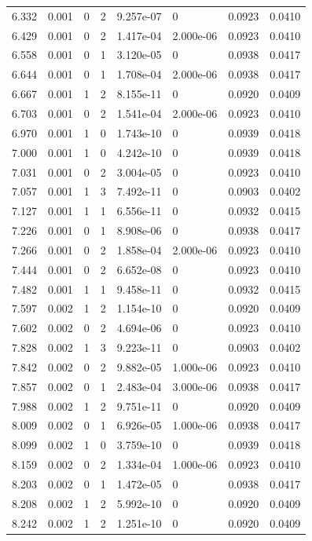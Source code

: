 \documentclass[preview]{standalone}
\begin{document}
{{{\begin{tabular}{L{1.2cm}C{1.2cm} C{0.3cm}C{0.5cm} C{1.4cm}C{1.4cm} C{1.4cm}C{1.4cm}}
  6.332  &  0.001  & 0     &  2 &  9.257e-07  & 0  & 0.0923 &  0.0410   \\ 
  6.429  &  0.001  & 0     &  2 &  1.417e-04  & 2.000e-06  & 0.0923 &  0.0410   \\ 
  6.558  &  0.001  & 0     &  1 &  3.120e-05  & 0  & 0.0938 &  0.0417   \\ 
  6.644  &  0.001  & 0     &  1 &  1.708e-04  & 2.000e-06  & 0.0938 &  0.0417   \\ 
  6.667  &  0.001  & 1     &  2 &  8.155e-11  & 0  & 0.0920 &  0.0409   \\ 
  6.703  &  0.001  & 0     &  2 &  1.541e-04  & 2.000e-06  & 0.0923 &  0.0410   \\ 
  6.970  &  0.001  & 1     &  0 &  1.743e-10  & 0  & 0.0939 &  0.0418   \\ 
  7.000  &  0.001  & 1     &  0 &  4.242e-10  & 0  & 0.0939 &  0.0418   \\ 
  7.031  &  0.001  & 0     &  2 &  3.004e-05  & 0  & 0.0923 &  0.0410   \\ 
  7.057  &  0.001  & 1     &  3 &  7.492e-11  & 0  & 0.0903 &  0.0402   \\ 
  7.127  &  0.001  & 1     &  1 &  6.556e-11  & 0  & 0.0932 &  0.0415   \\ 
  7.226  &  0.001  & 0     &  1 &  8.908e-06  & 0  & 0.0938 &  0.0417   \\ 
  7.266  &  0.001  & 0     &  2 &  1.858e-04  & 2.000e-06  & 0.0923 &  0.0410   \\ 
  7.444  &  0.001  & 0     &  2 &  6.652e-08  & 0  & 0.0923 &  0.0410   \\ 
  7.482  &  0.001  & 1     &  1 &  9.458e-11  & 0  & 0.0932 &  0.0415   \\ 
  7.597  &  0.002  & 1     &  2 &  1.154e-10  & 0  & 0.0920 &  0.0409   \\ 
  7.602  &  0.002  & 0     &  2 &  4.694e-06  & 0  & 0.0923 &  0.0410   \\ 
  7.828  &  0.002  & 1     &  3 &  9.223e-11  & 0  & 0.0903 &  0.0402   \\ 
  7.842  &  0.002  & 0     &  2 &  9.882e-05  & 1.000e-06  & 0.0923 &  0.0410   \\ 
  7.857  &  0.002  & 0     &  1 &  2.483e-04  & 3.000e-06  & 0.0938 &  0.0417   \\ 
  7.988  &  0.002  & 1     &  2 &  9.751e-11  & 0  & 0.0920 &  0.0409   \\ 
  8.009  &  0.002  & 0     &  1 &  6.926e-05  & 1.000e-06  & 0.0938 &  0.0417   \\ 
  8.099  &  0.002  & 1     &  0 &  3.759e-10  & 0  & 0.0939 &  0.0418   \\ 
  8.159  &  0.002  & 0     &  2 &  1.334e-04  & 1.000e-06  & 0.0923 &  0.0410   \\ 
  8.203  &  0.002  & 0     &  1 &  1.472e-05  & 0  & 0.0938 &  0.0417   \\ 
  8.208  &  0.002  & 1     &  2 &  5.992e-10  & 0  & 0.0920 &  0.0409   \\ 
  8.242  &  0.002  & 1     &  2 &  1.251e-10  & 0  & 0.0920 &  0.0409   \\ 
\hline 
\end{tabular} 

}}}
\end{document}
